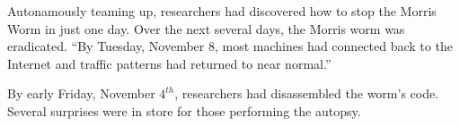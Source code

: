 Autonamously teaming up, researchers had discovered how to stop the Morris
Worm in just one day. Over the next several
days, the Morris worm was eradicated. ``By Tuesday, November 8, most machines had connected back to the Internet
and traffic patterns had returned to near normal.''\cite{spafford_internet_1989-1}

By early Friday, November $4^{th}$, researchers had disassembled the worm's
code\cite{spafford_crisis_1989}\cite{seeley_tour_1989}.
Several surprises were in store for those performing the autopsy.